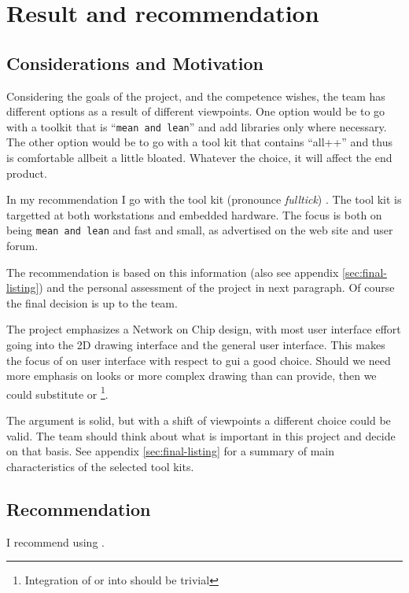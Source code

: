 \section{Result and recommendation}
\label{sec:recommendation}

\subsection{Considerations and Motivation}

Considering the goals of the project, and the competence wishes, the team has
different options as a result of different viewpoints.  One option would be to
go with a toolkit that is ``\texttt{mean and lean}'' and add libraries only
where necessary. The other option would be to go with a tool kit that contains
``all++'' and thus is comfortable allbeit a little bloated. Whatever the
choice, it will affect the end product. 

In my recommendation I go with the tool kit  (pronounce
\emph{fulltick}) . The tool kit is targetted at both workstations and embedded
hardware. The focus is both on being \texttt{mean and lean} and fast and small,
as advertised on the  web site and user forum.

The recommendation is based on this information (also see appendix
\ref{sec:final-listing}) and the personal assessment of the project in next
paragraph. Of course the final decision is up to the team.

The project emphasizes a Network on Chip design, with most user interface
effort going into the 2D drawing interface and the general user interface.
This makes the focus of  on user interface with respect to gui a good
choice. Should we need more emphasis on looks or more complex drawing than
 can provide, then we could substitute  or
\footnote{Integration of  or  into  should
be trivial}.

\par The argument is solid, but with a shift of viewpoints a different choice
could be valid.  The team should think about what is important in this project
and decide on that basis. See appendix \ref{sec:final-listing} for a summary of
main characteristics of the selected tool kits.

\subsection{Recommendation} 

I recommend using .

